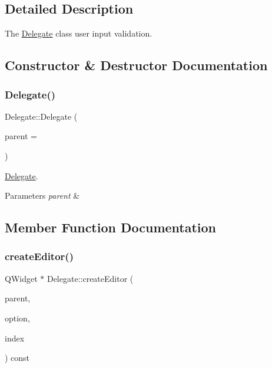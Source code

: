 \subsection{Detailed Description}
The \hyperlink{class_delegate}{Delegate} class user input validation. 

\subsection{Constructor \& Destructor Documentation}
\mbox{\label{class_delegate_a63c7694c7a15f36e0efdda9c98aff213}} 
\subsubsection{\texorpdfstring{Delegate()}{Delegate()}}
{\footnotesize\ttfamily Delegate\+::\+Delegate (\begin{DoxyParamCaption}\item[{Q\+Object $\ast$}]{parent = {} }\end{DoxyParamCaption})}



\hyperlink{class_delegate}{Delegate}. 


\begin{DoxyParams}{Parameters}
{\em parent} & \\
\hline
\end{DoxyParams}


\subsection{Member Function Documentation}
\mbox{\label{class_delegate_a3abc4fe9f16fa7c5e64ffcf48cced054}} 
\subsubsection{\texorpdfstring{create\+Editor()}{createEditor()}}
{\footnotesize\ttfamily Q\+Widget $\ast$ Delegate\+::create\+Editor (\begin{DoxyParamCaption}\item[{Q\+Widget $\ast$}]{parent,  }\item[{const Q\+Style\+Option\+View\+Item \&}]{option,  }\item[{const Q\+Model\+Index \&}]{index }\end{DoxyParamCaption}) const}



